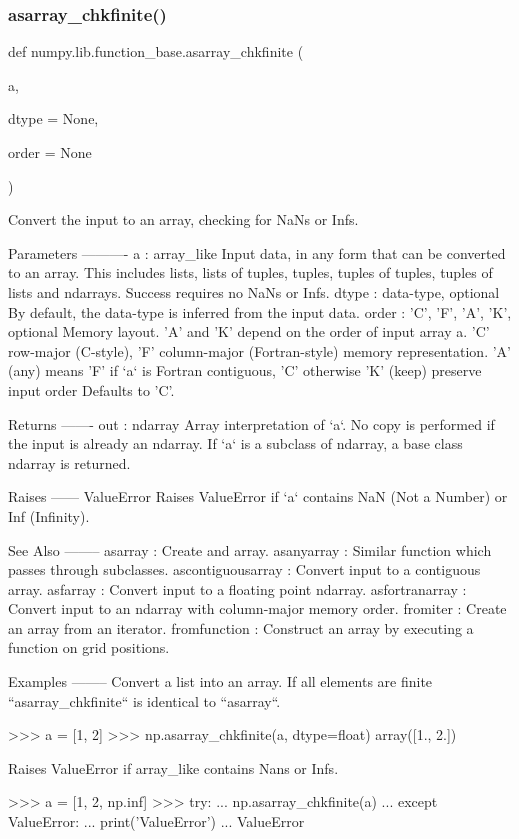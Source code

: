 \subsubsection{\texorpdfstring{asarray\+\_\+chkfinite()}{asarray\_chkfinite()}}
{\footnotesize\ttfamily def numpy.\+lib.\+function\+\_\+base.\+asarray\+\_\+chkfinite (\begin{DoxyParamCaption}\item[{}]{a,  }\item[{}]{dtype = {\ttfamily None},  }\item[{}]{order = {\ttfamily None} }\end{DoxyParamCaption})}

\begin{DoxyVerb}Convert the input to an array, checking for NaNs or Infs.

Parameters
----------
a : array_like
    Input data, in any form that can be converted to an array.  This
    includes lists, lists of tuples, tuples, tuples of tuples, tuples
    of lists and ndarrays.  Success requires no NaNs or Infs.
dtype : data-type, optional
    By default, the data-type is inferred from the input data.
order : {'C', 'F', 'A', 'K'}, optional
    Memory layout.  'A' and 'K' depend on the order of input array a.
    'C' row-major (C-style),
    'F' column-major (Fortran-style) memory representation.
    'A' (any) means 'F' if `a` is Fortran contiguous, 'C' otherwise
    'K' (keep) preserve input order
    Defaults to 'C'.

Returns
-------
out : ndarray
    Array interpretation of `a`.  No copy is performed if the input
    is already an ndarray.  If `a` is a subclass of ndarray, a base
    class ndarray is returned.

Raises
------
ValueError
    Raises ValueError if `a` contains NaN (Not a Number) or Inf (Infinity).

See Also
--------
asarray : Create and array.
asanyarray : Similar function which passes through subclasses.
ascontiguousarray : Convert input to a contiguous array.
asfarray : Convert input to a floating point ndarray.
asfortranarray : Convert input to an ndarray with column-major
                 memory order.
fromiter : Create an array from an iterator.
fromfunction : Construct an array by executing a function on grid
               positions.

Examples
--------
Convert a list into an array.  If all elements are finite
``asarray_chkfinite`` is identical to ``asarray``.

>>> a = [1, 2]
>>> np.asarray_chkfinite(a, dtype=float)
array([1., 2.])

Raises ValueError if array_like contains Nans or Infs.

>>> a = [1, 2, np.inf]
>>> try:
...     np.asarray_chkfinite(a)
... except ValueError:
...     print('ValueError')
...
ValueError\end{DoxyVerb}
 \mbox{\label{namespacenumpy_1_1lib_1_1function__base_aa761010465aba3da29779545b3692af5}} 

